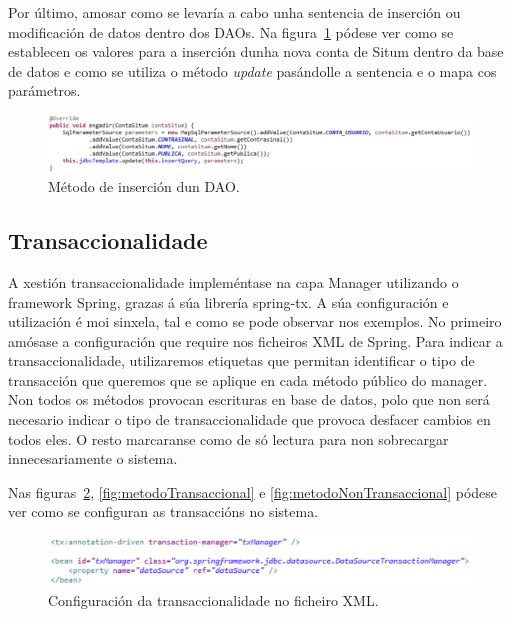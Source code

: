 Por último, amosar como se levaría a cabo unha sentencia de inserción ou modificación de datos dentro dos DAOs. Na figura~\ref{fig:daoInsert} pódese ver como se establecen os valores para a inserción dunha nova conta de Situm dentro da base de datos e como se utiliza o método \emph{update} pasándolle a sentencia e o mapa cos parámetros.

\begin{figure}[tbh] 
	\begin{center}
		\includegraphics[width=1\textwidth]{figures/codigo/daoInsert}
		\caption{Método de inserción dun DAO.}
		\label{fig:daoInsert}
	\end{center}
\end{figure}


\subsection{Transaccionalidade}
A xestión transaccionalidade impleméntase na capa Manager utilizando o framework Spring, grazas á súa librería spring-tx. A súa configuración e utilización é moi sinxela, tal e como se pode observar nos exemplos. No primeiro amósase a configuración que require nos ficheiros XML de Spring. Para indicar a transaccionalidade, utilizaremos etiquetas que permitan identificar o tipo de transacción que queremos que se aplique en cada método público do manager. Non todos os métodos provocan escrituras en base de datos, polo que non será necesario indicar o tipo de transaccionalidade que provoca desfacer cambios en todos eles. O resto marcaranse como de só lectura para non sobrecargar innecesariamente o sistema.

Nas figuras~\ref{fig:transaccionConfiguracion}, \ref{fig:metodoTransaccional} e \ref{fig:metodoNonTransaccional} pódese ver como se configuran as transaccións no sistema.


\begin{figure}[tbh] 
	\begin{center}
		\includegraphics[width=1\textwidth]{figures/codigo/transaccionConfiguracion}
		\caption{Configuración da transaccionalidade no ficheiro XML.}
		\label{fig:transaccionConfiguracion}
	\end{center}
\end{figure}

